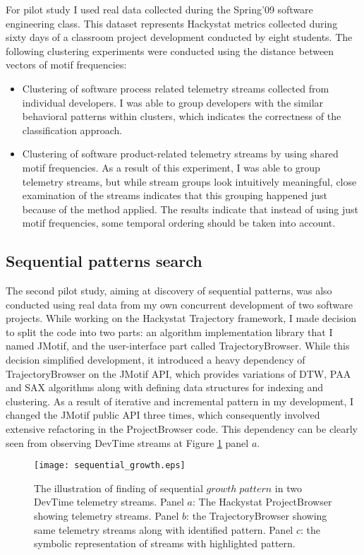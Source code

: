 For pilot study I used real data collected during the Spring'09 software engineering class. This dataset represents Hackystat metrics collected during sixty days of a classroom project development conducted by eight students. The following clustering experiments were conducted using the distance between vectors of motif frequencies:
\begin{itemize}
	\item Clustering of software process related telemetry streams collected from individual developers. I was able to group developers with the similar behavioral patterns within clusters, which indicates the correctness of the classification approach.
	\item Clustering of software product-related telemetry streams by using shared motif frequencies. As a result of this experiment, I was able to group telemetry streams, but while stream groups look intuitively meaningful, close examination of the streams indicates that this grouping happened just because of the method applied. The results indicate that instead of using just motif frequencies, some temporal ordering should be taken into account.
\end{itemize}

\subsection{Sequential patterns search}
The second pilot study, aiming at discovery of sequential patterns, was also conducted using real data from my own concurrent development of two software projects. While working on the Hackystat Trajectory framework, I made decision to split the code into two parts: an algorithm implementation library that I named JMotif, and the user-interface part called TrajectoryBrowser. While this decision simplified development, it introduced a heavy dependency of TrajectoryBrowser on the JMotif API, which provides variations of DTW, PAA and SAX algorithms along with defining data structures for indexing and clustering. As a result of iterative and incremental pattern in my development, I changed the JMotif public API three times, which consequently involved extensive refactoring in the ProjectBrowser code. This dependency can be clearly seen from observing DevTime streams at Figure \ref{fig:sequential_growth} panel $a$. 

\begin{figure}[tbp]
   \centering
   \texttt{[image: sequential\_growth.eps]}
   \caption{The illustration of finding of sequential $growth \; pattern$ in two DevTime telemetry streams. Panel $a$: The Hackystat ProjectBrowser showing telemetry streams. Panel $b$: the TrajectoryBrowser showing same telemetry streams along with identified pattern. Panel $c$: the symbolic representation of streams with highlighted pattern.}
   \label{fig:sequential_growth}
\end{figure}

